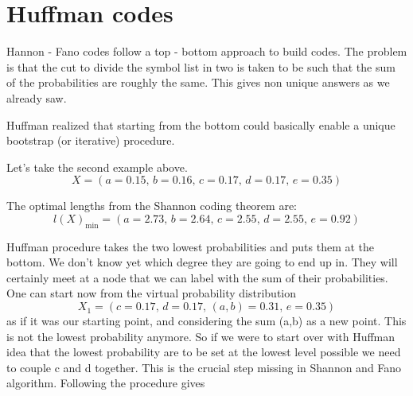 \section{Huffman codes}
Hannon - Fano codes follow a top - bottom approach to build codes. The problem is that the cut to divide the symbol list in two is taken to be such that the sum of the probabilities are roughly the same. This gives non unique answers as we already saw. 

Huffman realized that starting from the bottom could basically enable a unique bootstrap (or iterative) procedure.

Let's take the second example above. 
 $$X = (a=0.15,\, b=0.16,\, c=0.17,\, d=0.17,\, e=0.35)$$
 
The optimal lengths from the Shannon coding theorem are:
 $$l(X)_{\text{min}} = (a=2.73,\, b=2.64,\, c=2.55,\, d=2.55,\, e=0.92)$$

Huffman procedure takes the two lowest probabilities and puts them at the bottom. We don't know yet which degree they are going to end up in. They will certainly meet at a node that we can label with the sum of their probabilities. One can start now from the virtual probability distribution
$$X_1 = (c=0.17,\, d=0.17,\, (a,b)=0.31,\, e=0.35)$$
as if it was our starting point, and considering the sum (a,b) as a new point. This is not the lowest probability anymore. So if we were to start over with Huffman idea that the lowest probability are to be set at the lowest level possible we need to couple c and d together. This is the crucial step missing in Shannon and Fano algorithm. Following the procedure gives
 \begin{figure}[h]
 	\begin{center}
 	\end{center}
 \end{figure}
 

